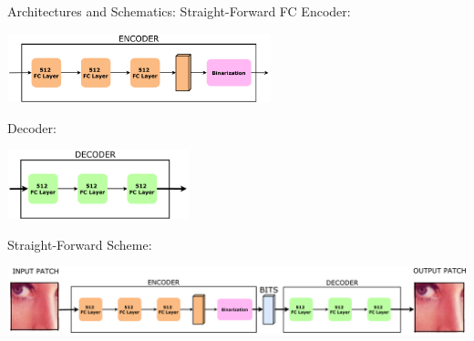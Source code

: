 \documentclass[10pt]{beamer}
\begin{document}
\begin{frame}{Architectures and Schematics: Straight-Forward FC }
      Encoder:
      \begin{center}
        \includegraphics[height=20mm]{./img/FCencoder.pdf}
      \end{center}
      Decoder:
      \begin{center}
        \includegraphics[height=20mm]{./img/FCdecoder.pdf}
      \end{center}
      Straight-Forward Scheme:
      \begin{center}
      \includegraphics[width=\linewidth]{./img/Straighfroward_FC_Scheme.pdf}
      \end{center}
\end{frame}
\end{document}
